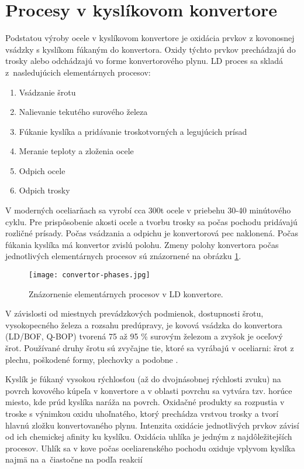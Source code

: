 \section{Procesy v kyslíkovom konvertore}

Podstatou výroby ocele v kyslíkovom konvertore je oxidácia prvkov z kovonosnej vsádzky s kyslíkom fúkaným do konvertora. Oxidy týchto prvkov prechádzajú do trosky alebo odchádzajú vo forme konvertorového plynu. LD proces sa skladá z~nasledujúcich elementárnych procesov:

\begin{enumerate}
	\item Vsádzanie šrotu
	\item Nalievanie tekutého surového železa
	\item Fúkanie kyslíka a pridávanie troskotvorných a legujúcich prísad
	\item Meranie teploty a zloženia ocele
	\item Odpich ocele
	\item Odpich trosky
\end{enumerate}

V moderných oceliarňach sa vyrobí cca 300t ocele v priebehu 30-40 minútového cyklu. Pre prispôsobenie akosti ocele a tvorbu trosky sa počas pochodu pridávajú rozličné prísady. Počas vsádzania a odpichu je konvertorová pec naklonená. Počas fúkania kyslíka má konvertor zvislú polohu. Zmeny polohy konvertora počas jednotlivých elementárnych procesov sú znázornené na obrázku \ref{o:30}.

\begin{figure}[h!]
	\centering
	\texttt{[image: convertor-phases.jpg]}
	\caption{Znázornenie elementárnych procesov v LD konvertore.}
	\label{o:30}
\end{figure}

V závislosti od miestnych prevádzkových podmienok, dostupnosti šrotu, vysokopecného železa a rozsahu predúpravy, je kovová vsádzka do konvertora (LD/BOF, Q-BOP) tvorená 75 až 95 \% surovým železom a zvyšok je oceľový šrot. Používané druhy šrotu sú zvyčajne tie, ktoré sa vyrábajú v oceliarni: šrot z plechu, poškodené formy, plechovky a podobne \cite{Turkdogan1996}.

Kyslík je fúkaný vysokou rýchlosťou (až do dvojnásobnej rýchlosti zvuku) na povrch kovového kúpeľa v konvertore a v oblasti povrchu sa vytvára tzv. horúce miesto, kde prúd kyslíka naráža na povrch. Oxidačné produkty sa rozpustia v troske s výnimkou oxidu uhoľnatého, ktorý prechádza vrstvou trosky a tvorí hlavnú zložku konvertovaného plynu. Intenzita oxidácie jednotlivých prvkov závisí od ich chemickej afinity ku kyslíku. Oxidácia uhlíka je jedným z najdôležitejších procesov. Uhlík sa v kove počas oceliarenského pochodu oxiduje vplyvom kyslíka najmä na  a~čiastočne na  podľa reakcií

